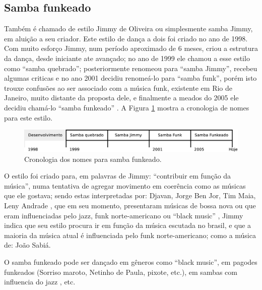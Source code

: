 \subsection{Samba funkeado}
\label{subsec:sambafunkeado}
Também é chamado de estilo Jimmy de Oliveira ou simplesmente  samba Jimmy, 
em aluição a seu criador.
Este estilo de dança a dois foi criado no ano de 1998.
Com muito esforço Jimmy, num período aproximado de 6 meses, 
criou a estrutura da dança, desde iniciante ate avançado;
no ano de 1999 ele  chamou a esse estilo como ``samba quebrado'';  
posteriormente renomeou  para ``samba Jimmy'', 
recebeu algumas criticas e no ano 2001 decidiu renomeá-lo para ``samba funk'',
porém isto trouxe confusões   ao ser associado com a música funk, existente em Rio de Janeiro,
muito distante da proposta dele, e
finalmente a meados do 2005 ele decidiu chamá-lo ``samba funkeado''  \cite{sambafunkeadoJimmyDeOliveiraPart1}.
A Figura \ref{fig:funkeadocrono1} mostra a cronologia de nomes para este estilo.
\begin{figure}[h]
  \centering
    \includegraphics[width=1.0\textwidth]{chapters/cap-historia-dancasamba/sambafunkeado.eps}
  \caption{Cronologia dos nomes para samba funkeado.}
\label{fig:funkeadocrono1}
\end{figure}

O estilo foi criado para, em palavras de Jimmy: ``contribuir em função da música'', 
numa tentativa de agregar movimento em coerência como as músicas que ele gostava;
sendo estas interpretadas por:
Djavan, Jorge Ben Jor, Tim Maia, Leny Andrade \cite{sambafunkeadoJimmyDeOliveiraPart1}, que em seu momento, 
presentaram músicas de bossa nova ou que eram influenciadas pelo jazz, 
funk norte-americano ou ``black music'' \cite{sambafunkeadoJimmyDeOliveiraPart1} \cite{sambafunkeadoJimmyDeOliveiraPart3},
Jimmy indica que seu estilo procura ir em função da música escutada no brasil, 
e que a maioria da música atual é influenciada pelo funk norte-americano;
como a música de: João Sabiá. 

O samba funkeado pode ser dançado em gêneros como ``black music'',
em pagodes funkeados (Sorriso maroto, Netinho de Paula, pixote, etc.), 
em sambas com influencia do jazz \cite{sambafunkeadoJimmyDeOliveiraPart3}, etc. 

